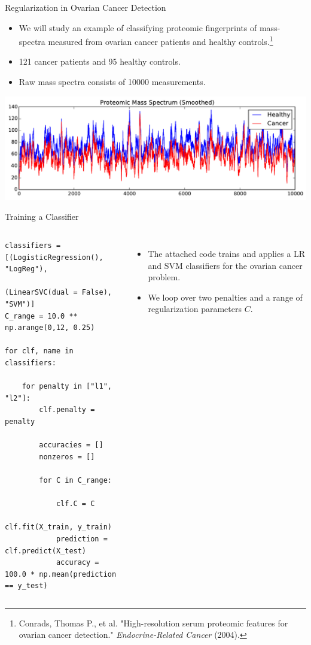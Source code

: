 \documentclass[10pt, aspectratio=169]{beamer} %
\begin{document}
\begin{frame}{Regularization in Ovarian Cancer Detection}
\begin{itemize}
\item We will study an example of classifying proteomic fingerprints of mass-spectra
measured from ovarian cancer patients and healthy controls.\footnote{\tiny Conrads, Thomas P., et al. "High-resolution serum proteomic features for ovarian cancer detection." \emph{Endocrine-Related Cancer} (2004).}
\item 121 cancer patients and 95 healthy controls.
\item Raw mass spectra consists of 10000 measurements.
\end{itemize}

\begin{center}
	\includegraphics[width=0.5\columnwidth]{ovariancancer_plot.pdf}
\end{center}
\end{frame}

\begin{frame}[fragile]{Training a Classifier}
\begin{columns}[onlytextwidth]
\begin{lstlisting}
classifiers = [(LogisticRegression(), "LogReg"),
               (LinearSVC(dual = False), "SVM")]
C_range = 10.0 ** np.arange(0,12, 0.25)

for clf, name in classifiers:

    for penalty in ["l1", "l2"]:            
        clf.penalty = penalty

        accuracies = []
        nonzeros = []

        for C in C_range:

            clf.C = C
            clf.fit(X_train, y_train)
            prediction = clf.predict(X_test)
            accuracy = 100.0 * np.mean(prediction == y_test)
\end{lstlisting}
\begin{itemize}
\item The attached code trains and applies a LR and SVM
classifiers for the ovarian cancer problem.
\item We loop over two penalties and a range of regularization parameters $C$.
\end{itemize}
\end{columns}
\end{frame}
\end{document}
